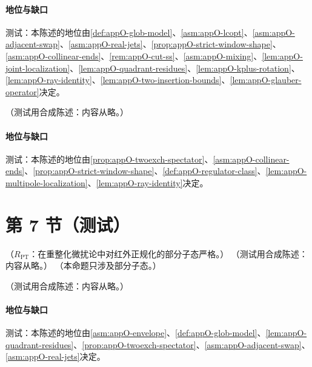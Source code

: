 \paragraph{地位与缺口}测试：本陈述的地位由\cref{def:appO-glob-model}、\cref{asm:appO-lcopt}、\cref{asm:appO-adjacent-swap}、\cref{asm:appO-real-jets}、\cref{prop:appO-strict-window-shape}、\cref{asm:appO-collinear-ends}、\cref{rem:appO-cut-ss}、\cref{asm:appO-mixing}、\cref{lem:appO-joint-localization}、\cref{lem:appO-quadrant-residues}、\cref{lem:appO-kplus-rotation}、\cref{lem:appO-ray-identity}、\cref{lem:appO-two-insertion-bounds}、\cref{lem:appO-glauber-operator}决定。

\begin{proposition}\label{prop:appO-twoexch-regulated}
（测试用合成陈述：内容从略。）
\end{proposition}
\paragraph{地位与缺口}测试：本陈述的地位由\cref{prop:appO-twoexch-spectator}、\cref{asm:appO-collinear-ends}、\cref{prop:appO-strict-window-shape}、\cref{def:appO-regulator-class}、\cref{lem:appO-multipole-localization}、\cref{lem:appO-ray-identity}决定。

\section{第 7 节（测试）}\label{sec:appO-deformation}

\begin{proposition}\label{prop:appO-strict-window-shape}
（$R_{\mathrm{PT}}$：在重整化微扰论中对红外正规化的部分子态严格。）
（测试用合成陈述：内容从略。）
（本命题只涉及部分子态。）
\end{proposition}

\begin{proposition}\label{prop:appO-pergraph-weights}
（测试用合成陈述：内容从略。）
\end{proposition}
\paragraph{地位与缺口}测试：本陈述的地位由\cref{asm:appO-envelope}、\cref{def:appO-glob-model}、\cref{lem:appO-quadrant-residues}、\cref{prop:appO-twoexch-spectator}、\cref{asm:appO-adjacent-swap}、\cref{asm:appO-real-jets}决定。

